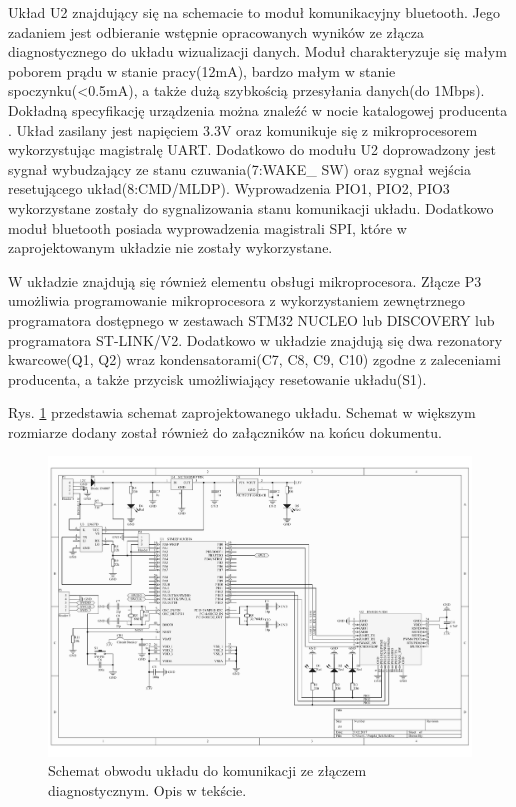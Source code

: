 \documentclass[12pt, twoside]{article} %
\numberwithin{equation}{subsection}
\numberwithin{figure}{section}
\numberwithin{table}{section}
\begin{document}
		Układ U2 znajdujący się na schemacie to moduł komunikacyjny bluetooth. Jego zadaniem jest odbieranie wstępnie opracowanych wyników ze złącza diagnostycznego do układu wizualizacji danych. Moduł charakteryzuje się małym poborem prądu w stanie pracy(12mA), bardzo małym w stanie spoczynku(<0.5mA), a także dużą szybkością przesyłania danych(do 1Mbps). Dokładną specyfikację urządzenia można znaleźć w nocie katalogowej producenta \cite{RN4020}. Układ zasilany jest napięciem 3.3V oraz komunikuje się z mikroprocesorem wykorzystując magistralę UART. Dodatkowo do modułu U2 doprowadzony jest sygnał wybudzający ze stanu czuwania(7:WAKE\_ SW) oraz sygnał wejścia resetującego układ(8:CMD/MLDP). Wyprowadzenia PIO1, PIO2, PIO3 wykorzystane zostały do sygnalizowania stanu komunikacji układu. Dodatkowo moduł bluetooth posiada wyprowadzenia magistrali SPI, które w zaprojektowanym układzie nie zostały wykorzystane. 
		
		\newpage		
		
		W układzie znajdują się również elementu obsługi mikroprocesora. Złącze P3 umożliwia programowanie mikroprocesora z wykorzystaniem zewnętrznego programatora dostępnego w zestawach STM32 NUCLEO lub DISCOVERY lub programatora ST-LINK/V2. Dodatkowo w układzie znajdują się dwa rezonatory kwarcowe(Q1, Q2) wraz kondensatorami(C7, C8, C9, C10) zgodne z zaleceniami producenta, a także przycisk umożliwiający resetowanie układu(S1). 
		
		Rys. \ref{rys_schemat_ukladu_elektrycznego} przedstawia schemat zaprojektowanego układu. Schemat w większym rozmiarze dodany został również do załączników na końcu dokumentu.
		
		\begin{figure}[!h]
			\centering
			\includegraphics[scale=0.6, angle=90]{Images/SchematUkladuElektrycznego.pdf}
			\caption{Schemat obwodu układu do komunikacji ze złączem diagnostycznym. Opis w tekście.}
			\label{rys_schemat_ukladu_elektrycznego}
		\end{figure}
	
\end{document}
